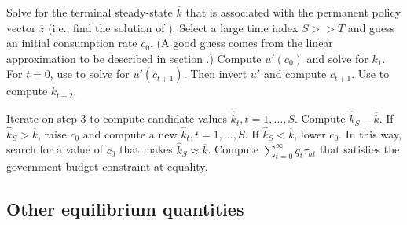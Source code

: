 \medskip
{}  Solve  for the terminal steady-state $\overline k$
that is associated with the permanent policy vector $\overline z$
(i.e., find the solution of ).
\medskip
{} Select a large time index $S > > T$ and guess an initial
consumption rate $c_0$.  (A good guess comes from
the linear approximation to be described in section .)
Compute $u'(c_0)$ and solve
 for $k_1$.
\medskip
{}  For $t=0$, use  to solve for $u'(c_{t+1})$.
Then invert $u'$ and compute $c_{t+1}$.   Use  to compute
$k_{t+2}$.

\medskip
{} Iterate on step 3 to compute candidate values
$\hat k_t, t=1, \ldots, S$.
\medskip
{}  Compute $  \hat k_S -\overline k$.
\medskip
{}  If $\hat k_S > \overline k$, raise $c_0$ and compute a new
$\hat k_t, t=1, \ldots, S$.
\medskip
{}  If $\hat k_S < \overline k$, lower $c_0$.
\medskip
{} In this way, search for a value of $c_0$ that makes
$\hat k_S \approx \overline k$.
\medskip
{} Compute $\sum_{t=0}^\infty q_t \tau_{ht}$ that satisfies the
government budget constraint at equality.


\subsection{Other equilibrium quantities}

